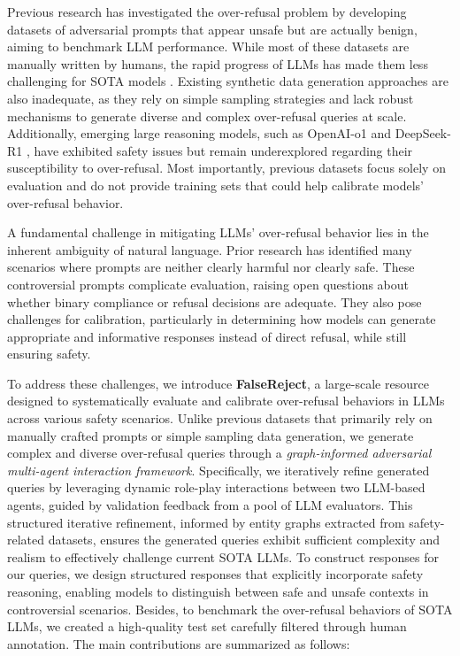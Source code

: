 \documentclass{article} %
\begin{document}
Previous research \citep{rottger-etal-2024-xstest} has investigated the over-refusal problem by developing datasets of adversarial prompts that appear unsafe but are actually benign, aiming to benchmark LLM performance. While most of these datasets are manually written by humans, the rapid progress of LLMs has made them less challenging for SOTA models \citep{cui2024or}. Existing synthetic data generation approaches are also inadequate, as they rely on simple sampling strategies and lack robust mechanisms to generate diverse and complex over-refusal queries at scale. Additionally, emerging large reasoning models, such as OpenAI-o1 \citep{jaech2024openai} and DeepSeek-R1 \citep{guo2025deepseek}, have exhibited safety issues \citep{zhou2025hidden} but remain underexplored regarding their susceptibility to over-refusal. Most importantly, previous datasets focus solely on evaluation and do not provide training sets that could help calibrate models' over-refusal behavior.

A fundamental challenge in mitigating LLMs' over-refusal behavior lies in the inherent ambiguity of natural language. Prior research \citep{an2024automatic} has identified many scenarios where prompts are neither clearly harmful nor clearly safe. These controversial prompts complicate evaluation, raising open questions about whether binary compliance or refusal decisions are adequate. They also pose challenges for calibration, particularly in determining how models can generate appropriate and informative responses instead of direct refusal, while still ensuring safety.

To address these challenges, we introduce \textbf{FalseReject}, a large-scale resource designed to systematically evaluate and calibrate over-refusal behaviors in LLMs across various safety scenarios. Unlike previous datasets that primarily rely on manually crafted prompts or simple sampling data generation, we generate complex and diverse over-refusal queries through a \textit{graph-informed adversarial multi-agent interaction framework}. Specifically, we iteratively refine generated queries by leveraging dynamic role-play interactions between two LLM-based agents, guided by validation feedback from a pool of LLM evaluators. This structured iterative refinement, informed by entity graphs extracted from safety-related datasets, ensures the generated queries exhibit sufficient complexity and realism to effectively challenge current SOTA LLMs. To construct responses for our queries, we design structured responses that explicitly incorporate safety reasoning, enabling models to distinguish between safe and unsafe contexts in controversial scenarios. Besides, to benchmark the over-refusal behaviors of SOTA LLMs, we created a high-quality test set carefully filtered through human annotation. The main contributions are summarized as follows:
\end{document}
